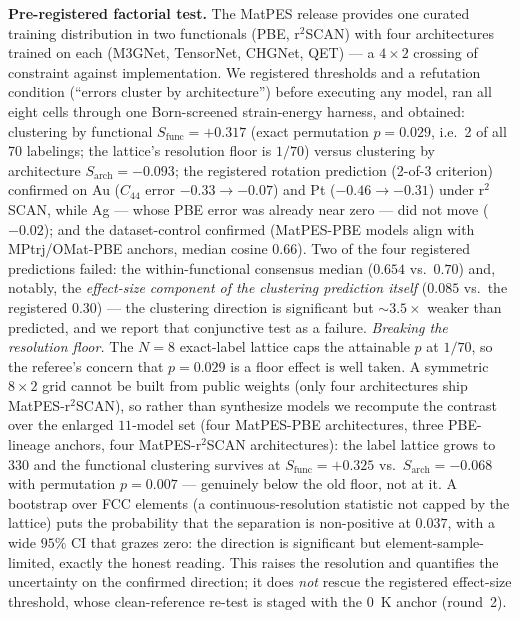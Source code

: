 \documentclass[11pt]{article}
\theoremstyle{remark}
\begin{document}
\textbf{Pre-registered factorial test.} The MatPES release \citep{kaplan2025}
provides one curated training distribution in two functionals (PBE, r$^2$SCAN)
with four architectures trained on each (M3GNet, TensorNet, CHGNet, QET) ---
a $4{\times}2$ crossing of constraint against implementation. We registered
thresholds and a refutation condition (``errors cluster by architecture'')
before executing any model, ran all eight cells through one Born-screened
strain-energy harness, and obtained: clustering by functional
$S_{\mathrm{func}} = +0.317$ (exact permutation $p = 0.029$, i.e.\ 2 of all 70
labelings; the lattice's resolution floor is $1/70$) versus clustering by
architecture $S_{\mathrm{arch}} = -0.093$; the registered rotation prediction
(2-of-3 criterion) confirmed on Au ($C_{44}$ error $-0.33 \to -0.07$) and Pt
($-0.46 \to -0.31$) under r$^2$SCAN, while Ag --- whose PBE error was already
near zero --- did not move ($-0.02$); and the dataset-control confirmed
(MatPES-PBE models align with MPtrj/OMat-PBE anchors, median cosine $0.66$).
Two of the four registered predictions failed: the within-functional
consensus median ($0.654$ vs.\ $0.70$) and, notably, the \emph{effect-size
component of the clustering prediction itself} ($0.085$ vs.\ the registered
$0.30$) --- the clustering direction is significant but ${\sim}3.5\times$
weaker than predicted, and we report that conjunctive test as a failure.
\emph{Breaking the resolution floor.} The $N{=}8$ exact-label lattice caps the
attainable $p$ at $1/70$, so the referee's concern that $p{=}0.029$ is a
floor effect is well taken. A symmetric $8{\times}2$ grid cannot be built from
public weights (only four architectures ship MatPES-r$^2$SCAN), so rather than
synthesize models we recompute the contrast over the enlarged $11$-model set
(four MatPES-PBE architectures, three PBE-lineage anchors, four
MatPES-r$^2$SCAN architectures): the label lattice grows to $330$ and the
functional clustering survives at $S_{\mathrm{func}}{=}{+}0.325$ vs.\
$S_{\mathrm{arch}}{=}{-}0.068$ with permutation $p{=}0.007$ --- genuinely below
the old floor, not at it. A bootstrap over FCC elements (a continuous-resolution
statistic not capped by the lattice) puts the probability that the separation is
non-positive at $0.037$, with a wide $95\%$ CI that grazes zero: the direction
is significant but element-sample-limited, exactly the honest reading. This
raises the resolution and quantifies the uncertainty on the confirmed direction;
it does \emph{not} rescue the registered effect-size threshold, whose clean-reference
re-test is staged with the 0~K anchor (round~2).
\end{document}
